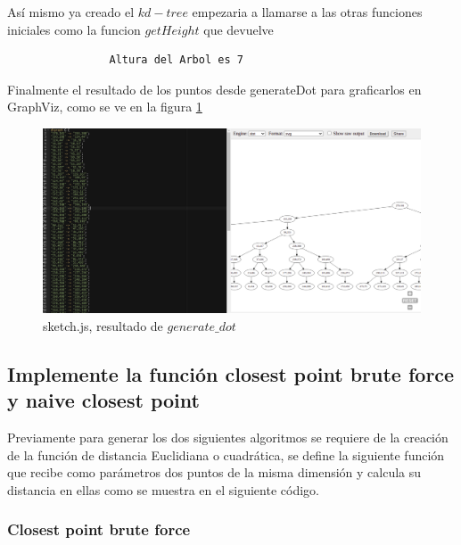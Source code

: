 \documentclass{article}
\begin{document}
		    
		    
		    Así mismo ya creado el $kd-tree$ empezaria a llamarse a las otras funciones iniciales como la funcion $getHeight$ que devuelve 
		    
		    \begin{verbatim}
		        Altura del Arbol es 7
		    \end{verbatim}
		    
		    Finalmente el resultado de los puntos desde generateDot para graficarlos en GraphViz, como se ve en la figura \ref{fig:sketch3}
		    
		    \begin{figure}[H]
    			\centering
    			\includegraphics[scale=0.35]{img/sketch3.png}
    			\caption{sketch.js, resultado de $generate\_dot$}
    			\label{fig:sketch3}
    		\end{figure}
		    
		    
		\subsection{Implemente la función closest point brute force y naive closest point}
		
		    Previamente para generar los dos siguientes algoritmos se requiere de la creación de la función de distancia Euclidiana o cuadrática, se define la siguiente función que recibe como parámetros dos puntos de la misma dimensión y calcula su distancia en ellas como se muestra en el siguiente código.
		    
		    
		
    	    \subsubsection{Closest point brute force}
    	        
\end{document}
